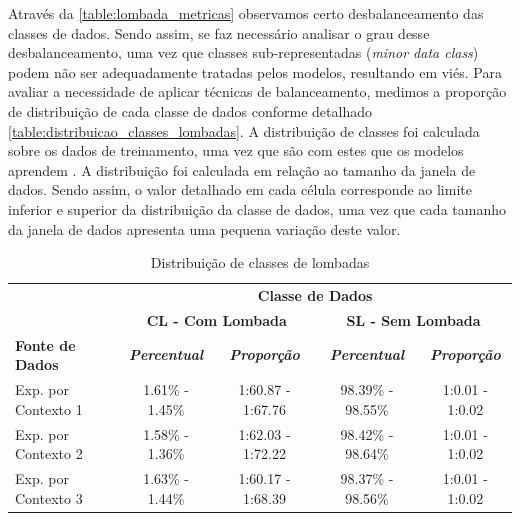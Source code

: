 Através da \autoref{table:lombada_metricas} observamos certo desbalanceamento das classes de dados. Sendo assim, se faz necessário analisar o grau desse desbalanceamento, uma vez que classes sub-representadas (\textit{minor data class}) podem não ser adequadamente tratadas pelos modelos, resultando em viés. Para avaliar a necessidade de aplicar técnicas de balanceamento, medimos a proporção de distribuição de cada classe de dados conforme detalhado \autoref{table:distribuicao_classes_lombadas}. A distribuição de classes foi calculada sobre os dados de treinamento, uma vez que são com estes que os modelos aprendem \cite{He2013, Kuhn2013}. A distribuição foi calculada em relação ao tamanho da janela de dados. Sendo assim, o valor detalhado em cada célula corresponde ao limite inferior e superior da distribuição da classe de dados, uma vez que cada tamanho da janela de dados apresenta uma pequena variação deste valor.

\begin{table}[h]
\caption{Distribuição de classes de lombadas}
\label{table:distribuicao_classes_lombadas}
\centering
\scriptsize
\begin{tabular}{lcccc}
\cmidrule(l){2-5}
\multicolumn{1}{c}{\multirow{2}{*}{\textbf{}}} & 
\multicolumn{4}{c}{\textbf{Classe de Dados}} \\ \cmidrule(l){2-5} 
\multicolumn{1}{c}{} & 
\multicolumn{2}{c}{\textbf{CL - Com Lombada}} & 
\multicolumn{2}{c}{\textbf{SL - Sem Lombada}} \\ \midrule
\textbf{Fonte de Dados} & 
\textit{\textbf{Percentual}} & 
\textit{\textbf{Proporção}} & 
\textit{\textbf{Percentual}} & 
\textit{\textbf{Proporção}} \\ \midrule
Exp. por Contexto 1 & 1.61\% - 1.45\% & 1:60.87 - 1:67.76 & 98.39\% - 98.55\% & 1:0.01 - 1:0.02 \\ \midrule
Exp. por Contexto 2 & 1.58\% - 1.36\% & 1:62.03 - 1:72.22 & 98.42\% - 98.64\% & 1:0.01 - 1:0.02 \\ \midrule
Exp. por Contexto 3 & 1.63\% - 1.44\% & 1:60.17 - 1:68.39 & 98.37\% - 98.56\% & 1:0.01 - 1:0.02 \\ \bottomrule
\end{tabular}
\end{table}

